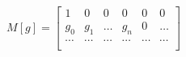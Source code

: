 \documentclass[preview]{standalone}
\begin{document}
\begin{align*}
M[g] = \begin{bmatrix}1 & 0 & 0 & 0 & 0 & 0 \\g_0 & g_1 & \ldots & g_n & 0 & \ldots \\\cdots & \cdots & \cdots & \cdots & \cdots & \cdots \\\end{bmatrix}
\end{align*}
\end{document}
